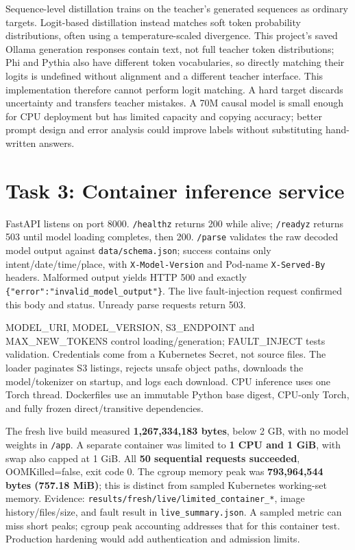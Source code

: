 \documentclass[10pt,a4paper]{article}
\begin{document}
Sequence-level distillation trains on the teacher's generated sequences as ordinary targets. Logit-based distillation instead matches soft token probability distributions, often using a temperature-scaled divergence. This project's saved Ollama generation responses contain text, not full teacher token distributions; Phi and Pythia also have different token vocabularies, so directly matching their logits is undefined without alignment and a different teacher interface. This implementation therefore cannot perform logit matching. A hard target discards uncertainty and transfers teacher mistakes. A 70M causal model is small enough for CPU deployment but has limited capacity and copying accuracy; better prompt design and error analysis could improve labels without substituting hand-written answers.


\section{Task 3: Container inference service}

FastAPI listens on port 8000. \texttt{/\allowbreak{}healthz} returns 200 while alive; \texttt{/\allowbreak{}readyz} returns 503 until model loading completes, then 200. \texttt{/\allowbreak{}parse} validates the raw decoded model output against \texttt{data/\allowbreak{}schema.json}; success contains only intent/date/time/place, with \texttt{X-Model-Version} and Pod-name \texttt{X-Served-By} headers. Malformed output yields HTTP 500 and exactly \texttt{\{"error":"invalid\_\allowbreak{}model\_\allowbreak{}output"\}}. The live fault-injection request confirmed this body and status. Unready parse requests return 503.


MODEL\_URI, MODEL\_VERSION, S3\_ENDPOINT and MAX\_NEW\_TOKENS control loading/generation; FAULT\_INJECT tests validation. Credentials come from a Kubernetes Secret, not source files. The loader paginates S3 listings, rejects unsafe object paths, downloads the model/tokenizer on startup, and logs each download. CPU inference uses one Torch thread. Dockerfiles use an immutable Python base digest, CPU-only Torch, and fully frozen direct/transitive dependencies.


The fresh live build measured \textbf{1,267,334,183 bytes}, below 2 GB, with no model weights in \texttt{/\allowbreak{}app}. A separate container was limited to \textbf{1 CPU and 1 GiB}, with swap also capped at 1 GiB. All \textbf{50 sequential requests succeeded}, OOMKilled=false, exit code 0. The cgroup memory peak was \textbf{793,964,544 bytes (757.18 MiB)}; this is distinct from sampled Kubernetes working-set memory. Evidence: \texttt{results/\allowbreak{}fresh/\allowbreak{}live/\allowbreak{}limited\_\allowbreak{}container\_\allowbreak{}*}, image history/files/size, and fault result in \texttt{live\_\allowbreak{}summary.json}. A sampled metric can miss short peaks; cgroup peak accounting addresses that for this container test. Production hardening would add authentication and admission limits.
\end{document}
